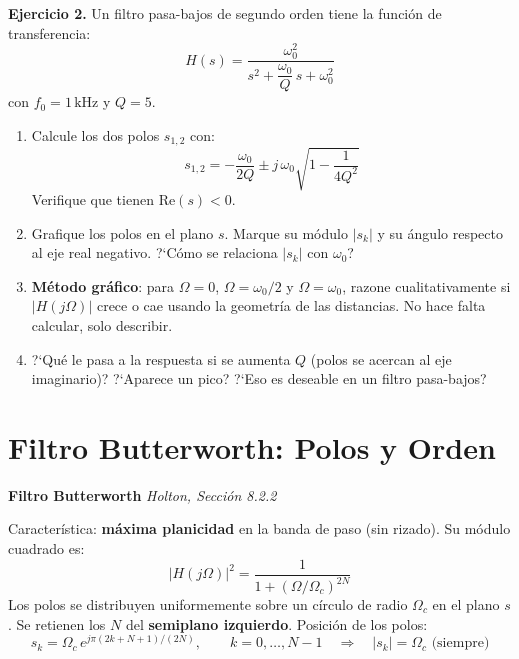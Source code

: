 \documentclass[11pt, a4paper]{article}
\begin{document}
\begin{exbox}
\textbf{Ejercicio 2.} Un filtro pasa-bajos de segundo orden tiene la funci\'on de transferencia:
$$H(s) = \frac{\omega_0^2}{s^2 + \dfrac{\omega_0}{Q}\,s + \omega_0^2}$$
con $f_0 = 1\,\text{kHz}$ y $Q = 5$.

\begin{enumerate}[label=\textbf{\alph*)}]
  \item Calcule los dos polos $s_{1,2}$ con:
  $$s_{1,2} = -\frac{\omega_0}{2Q} \pm j\,\omega_0\sqrt{1 - \frac{1}{4Q^2}}$$
  Verifique que tienen $\mathrm{Re}(s) < 0$.

  \item Grafique los polos en el plano $s$. Marque su m\'odulo $|s_k|$ y su \'angulo respecto al
  eje real negativo. ?`C\'omo se relaciona $|s_k|$ con $\omega_0$?

  \item \textbf{M\'etodo gr\'afico}: para $\Omega = 0$, $\Omega = \omega_0/2$ y $\Omega = \omega_0$,
  razone cualitativamente si $|H(j\Omega)|$ crece o cae usando la geometr\'ia de las distancias.
  No hace falta calcular, solo describir.

  \item ?`Qu\'e le pasa a la respuesta si se aumenta $Q$ (polos se acercan al eje imaginario)?
  ?`Aparece un pico? ?`Eso es deseable en un filtro pasa-bajos?

\end{enumerate}
\end{exbox}

\section{Filtro Butterworth: Polos y Orden}

\begin{conceptbox}
\textbf{Filtro Butterworth} \hfill \small\textit{Holton, Secci\'on 8.2.2}

\smallskip
Caracter\'istica: \textbf{m\'axima planicidad} en la banda de paso (sin rizado).
Su m\'odulo cuadrado es:
$$|H(j\Omega)|^2 = \frac{1}{1 + \left(\Omega/\Omega_c\right)^{2N}}$$
Los polos se distribuyen uniformemente sobre un c\'irculo de radio $\Omega_c$ en el plano $s$.
Se retienen los $N$ del \textbf{semiplano izquierdo}. Posici\'on de los polos:
$$s_k = \Omega_c\,e^{j\pi(2k+N+1)/(2N)}, \qquad k = 0,\ldots,N-1
\quad \Rightarrow \quad |s_k| = \Omega_c \text{ (siempre)}$$
\end{conceptbox}
\end{document}
